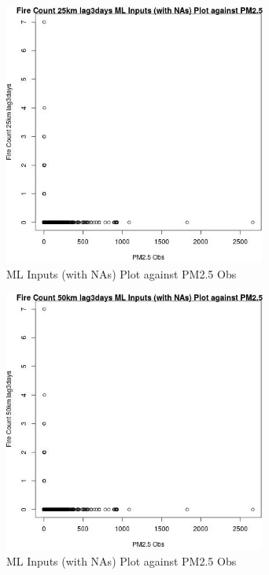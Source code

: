 \begin{figure} 
\centering  
\includegraphics[width=0.77\textwidth]{Code_Outputs/Report_ML_input_PM25_Step4_part_e_de_duplicated_aves_compiled_2019-05-21wNAs_Fire_Count_25km_lag3daysvPM25_Obs.jpg} 
\caption{\label{fig:Report_ML_input_PM25_Step4_part_e_de_duplicated_aves_compiled_2019-05-21wNAsFire_Count_25km_lag3daysvPM25_Obs}ML Inputs (with NAs) Plot against PM2.5 Obs} 
\end{figure} 
 

\begin{figure} 
\centering  
\includegraphics[width=0.77\textwidth]{Code_Outputs/Report_ML_input_PM25_Step4_part_e_de_duplicated_aves_compiled_2019-05-21wNAs_Fire_Count_50km_lag3daysvPM25_Obs.jpg} 
\caption{\label{fig:Report_ML_input_PM25_Step4_part_e_de_duplicated_aves_compiled_2019-05-21wNAsFire_Count_50km_lag3daysvPM25_Obs}ML Inputs (with NAs) Plot against PM2.5 Obs} 
\end{figure} 
 

